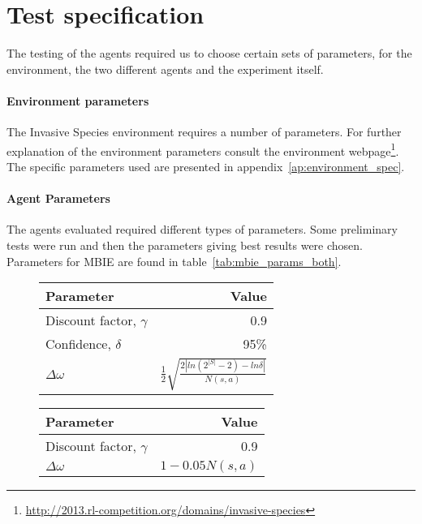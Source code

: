 \section{Test specification}
\label{sec:test_spec}

The testing of the agents required us to choose certain sets of parameters, for
the environment, the two different agents and the experiment itself. 

\paragraph{Environment parameters}

The Invasive Species environment requires a number of parameters. For further
explanation of the environment parameters consult the environment
webpage\footnote{\url{http://2013.rl-competition.org/domains/invasive-species}}.
The specific parameters used are presented in
appendix~\ref{ap:environment_spec}.

\paragraph{Agent Parameters}

The agents evaluated required different types of parameters. Some preliminary
tests were run and then the parameters giving best results were chosen.
Parameters for MBIE are found in table~\ref{tab:mbie_params_both}.

\begin{table}[H]
\centering
{}
\label{tab:mbie_params_both}

\begin{subfigure}[b]{0.47\textwidth}
    \centering
    \label{tab:mbie_params} 
    \begin{tabular}{lr}
     \toprule
     Parameter & Value \\
     \midrule
     Discount factor, $\gamma$ & 0.9 \\
     Confidence, $\delta$ & 95\% \\
     $\Delta \omega$ & $\frac{1}{2}\sqrt{\frac{2|ln(2^{|S|}-2) - ln  \delta |}{N(s,a)}}$ \\
     
     \bottomrule
    \end{tabular}
\end{subfigure}
\quad
\begin{subfigure}[b]{0.47\textwidth}
    \centering
    \label{tab:mbie_realistic_params}
    \begin{tabular}{lr}
     \toprule
     Parameter & Value \\
     \midrule
     Discount factor, $\gamma$ & 0.9 \\
     $\Delta \omega$ & $1 - 0.05 N(s,a)$ \\
     \bottomrule
    \end{tabular}
\end{subfigure}
\end{table}

